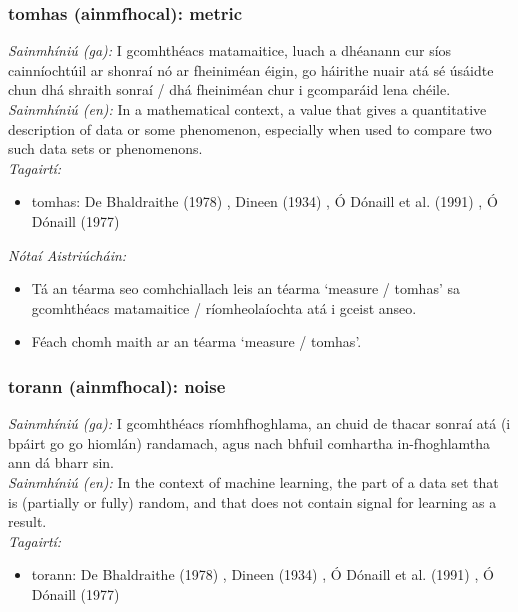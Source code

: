 \subsubsection*{tomhas (ainmfhocal): metric}
 \noindent \textit{Sainmhíniú (ga):} I gcomhthéacs matamaitice, luach a dhéanann cur síos cainníochtúil ar shonraí nó ar fheiniméan éigin, go háirithe nuair atá sé úsáidte chun dhá shraith sonraí / dhá fheiniméan chur i gcomparáid lena chéile.
\\
 \noindent \textit{Sainmhíniú (en):} In a mathematical context, a value that gives a quantitative description of data or some phenomenon, especially when used to compare two such data sets or phenomenons.
\\
 \noindent \textit{Tagairtí:}
\begin{itemize}
	\item tomhas: De Bhaldraithe (1978) \cite{de-bhaldraithe}, Dineen (1934) \cite{dineen}, Ó Dónaill et al. (1991) \cite{focloir-beag}, Ó Dónaill (1977) \cite{odonaill}
\end{itemize}

 \noindent \textit{Nótaí Aistriúcháin:}
\begin{itemize}
	\item Tá an téarma seo comhchiallach leis an téarma `measure / tomhas' sa gcomhthéacs matamaitice / ríomheolaíochta atá i gceist anseo.
	\item Féach chomh maith ar an téarma `measure / tomhas'.
\end{itemize}


\subsubsection*{torann (ainmfhocal): noise}
 \noindent \textit{Sainmhíniú (ga):} I gcomhthéacs ríomhfhoghlama, an chuid de thacar sonraí atá (i bpáirt go go hiomlán) randamach, agus nach bhfuil comhartha in-fhoghlamtha ann dá bharr sin.
\\
 \noindent \textit{Sainmhíniú (en):} In the context of machine learning, the part of a data set that is (partially or fully) random, and that does not contain signal for learning as a result.
\\
 \noindent \textit{Tagairtí:}
\begin{itemize}
	\item torann: De Bhaldraithe (1978) \cite{de-bhaldraithe}, Dineen (1934) \cite{dineen}, Ó Dónaill et al. (1991) \cite{focloir-beag}, Ó Dónaill (1977) \cite{odonaill}
\end{itemize}

